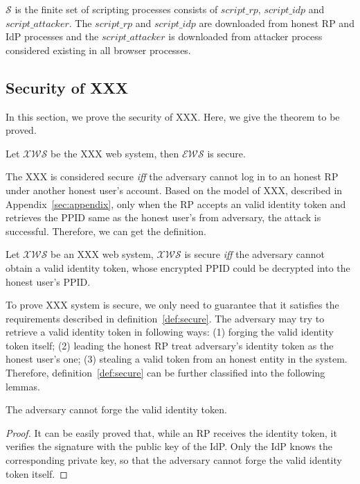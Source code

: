 $\mathcal{S}$ is the finite set of scripting processes consists of $script\_rp$, $script\_idp$ and $script\_attacker$. The $script\_rp$ and $script\_idp$ are downloaded from honest RP and IdP processes and the $script\_attacker$ is downloaded from attacker process considered existing in all browser processes. 

\subsection{Security of XXX}
In this section, we prove the security of XXX. Here, we give the theorem to be proved. 
\begin{theorem}
Let $\mathcal{XWS}$ be the XXX web system, then $\mathcal{EWS}$ is secure.
\label{the:secure}
\end{theorem} 

The XXX is considered secure  {\sl iff} the adversary cannot log in to an honest RP under another honest user's account. Based on the model of XXX, described in Appendix~\ref{sec:appendix}, only when the RP accepts an valid identity token and retrieves the PPID same as the honest user's from adversary, the attack is successful. Therefore, we can get the definition.

\begin{definition}
Let $\mathcal{XWS}$ be an XXX web system, $\mathcal{XWS}$ is secure \emph{iff} the adversary cannot obtain a valid identity token, whose encrypted PPID could be decrypted into the honest user's PPID.
\label{def:secure}
\end{definition}

To prove XXX system is secure, we only need to guarantee that it satisfies the requirements described in definition~\ref{def:secure}. 
The adversary may try to retrieve a valid identity token in following ways: (1) forging the valid identity token itself; (2) leading the honest RP treat adversary's identity token as the honest user's one; (3) stealing a valid token from an honest entity in the system. 
Therefore, definition~\ref{def:secure} can be further classified into the following lemmas. 

\begin{lemma}
The adversary cannot forge the valid identity token.
\label{lem:forge}
\end{lemma}

\begin{proof}
It can be easily proved that, while an RP receives the identity token, it verifies the signature with the public key of the IdP. Only the IdP knows the corresponding private key, so that the adversary cannot forge the valid identity token itself.
\end{proof}

